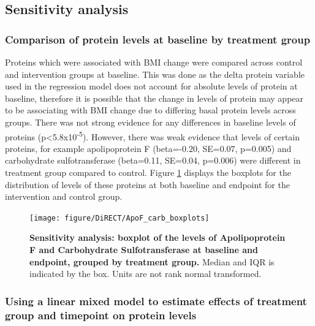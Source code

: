 \documentclass[11pt,twoside]{bristolthesis}
\begin{document}
\hypertarget{sensitivity-analysis-1}{%
\subsection{Sensitivity analysis}\label{sensitivity-analysis-1}}

\hypertarget{comparison-of-protein-levels-at-baseline-by-treatment-group}{%
\subsubsection{Comparison of protein levels at baseline by treatment group}\label{comparison-of-protein-levels-at-baseline-by-treatment-group}}

Proteins which were associated with BMI change were compared across control and intervention groups at baseline. This was done as the delta protein variable used in the regression model does not account for absolute levels of protein at baseline, therefore it is possible that the change in levels of protein may appear to be associating with BMI change due to differing basal protein levels across groups. There was not strong evidence for any differences in baseline levels of proteins (p\textless5.8x10\textsuperscript{-5}). However, there was weak evidence that levels of certain proteins, for example apolipoprotein F (beta=-0.20, SE=0.07, p=0.005) and carbohydrate sulfotransferase (beta=0.11, SE=0.04, p=0.006) were different in treatment group compared to control. Figure \ref{fig:ApoF-carb-boxplot} displays the boxplots for the distribution of levels of these proteins at both baseline and endpoint for the intervention and control group.



\begin{figure}

{\centering \texttt{[image: figure/DiRECT/ApoF\_carb\_boxplots]} 

}

\caption[Sensitivity analysis: boxplot of the levels of Apolipoprotein F and Carbohydrate Sulfotransferase at baseline and endpoint, grouped by treatment group.]{\textbf{Sensitivity analysis: boxplot of the levels of Apolipoprotein F and Carbohydrate Sulfotransferase at baseline and endpoint, grouped by treatment group.} Median and IQR is indicated by the box. Units are not rank normal transformed.}\label{fig:ApoF-carb-boxplot}
\end{figure}
\hypertarget{using-a-linear-mixed-model-to-estimate-effects-of-treatment-group-and-timepoint-on-protein-levels}{%
\subsubsection{Using a linear mixed model to estimate effects of treatment group and timepoint on protein levels}\label{using-a-linear-mixed-model-to-estimate-effects-of-treatment-group-and-timepoint-on-protein-levels}}
\end{document}
